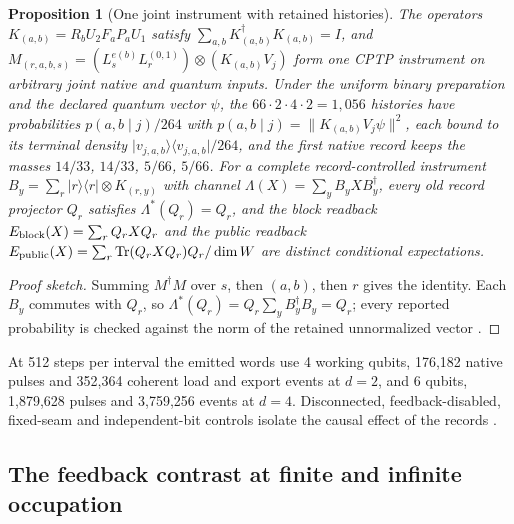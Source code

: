 \documentclass[11pt]{article}
\newtheorem{proposition}[theorem]{Proposition}
\theoremstyle{definition}
\theoremstyle{remark}
\theoremstyle{plain}
\newcommand{\proj}[1]{\lvert #1\rangle\langle #1\rvert}
\newcommand{\Tr}{\operatorname{Tr}}
\begin{document}
\begin{proposition}[One joint instrument with retained histories]
\label{prop:joint}
The operators $K_{(a,b)}=R_bU_2F_aP_aU_1$ satisfy
$\sum_{a,b}K_{(a,b)}^\dagger K_{(a,b)}=I$, and
$M_{(r,a,b,s)}=(L_s^{e(b)}L_r^{(0,1)})\otimes(K_{(a,b)}V_j)$ form one CPTP
instrument on arbitrary joint native and quantum inputs. Under the uniform
binary preparation and the declared quantum vector $\psi$, the
$66\cdot2\cdot4\cdot2=1{,}056$ histories have probabilities
$p(a,b\mid j)/264$ with $p(a,b\mid j)=\lVert K_{(a,b)}V_j\psi\rVert^2$, each
bound to its terminal density $\proj{v_{j,a,b}}/264$, and the first native
record keeps the masses $14/33$, $14/33$, $5/66$, $5/66$. For a complete
record-controlled instrument $B_y=\sum_r\proj r\otimes K_{(r,y)}$ with
channel $\Lambda(X)=\sum_yB_yXB_y^\dagger$, every old record projector $Q_r$
satisfies $\Lambda^*(Q_r)=Q_r$, and the block readback
$E_{\rm block}(X)=\sum_rQ_rXQ_r$ and the public readback
$E_{\rm public}(X)=\sum_r\Tr(Q_rXQ_r)Q_r/\dim W$ are distinct conditional
expectations.
\end{proposition}

\begin{proof}[Proof sketch]
Summing $M^\dagger M$ over $s$, then $(a,b)$, then $r$ gives the identity.
Each $B_y$ commutes with $Q_r$, so $\Lambda^*(Q_r)=Q_r\sum_yB_y^\dagger
B_y=Q_r$; every reported probability is checked against the norm of the
retained unnormalized vector \cite{csDERIV,rCS}.
\end{proof}

At 512 steps per interval the emitted words use 4 working qubits, 176,182
native pulses and 352,364 coherent load and export events at $d=2$, and 6
qubits, 1,879,628 pulses and 3,759,256 events at $d=4$. Disconnected,
feedback-disabled, fixed-seam and independent-bit controls isolate the
causal effect of the records \cite{csREADME}.

\subsection{The feedback contrast at finite and infinite occupation}
\label{sec:finite-contrast}
\label{sec:infinite}
\end{document}

